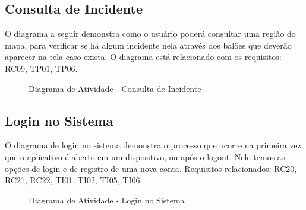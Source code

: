 \documentclass[12pt]{article}
\begin{document}
\subsection{Consulta de Incidente}

O diagrama a seguir demonstra como o usuário poderá consultar uma região do mapa, para verificar se há algum incidente nela através dos balões que deverão aparecer na tela caso exista. O diagrama está relacionado com os requisitos: RC09, TP01, TP06.

  \begin{figure}[!htb]
    \caption{\label{fig:diagConsultaInci} Diagrama de Atividade - Consulta de Incidente}
  \end{figure}

\vfill%
\pagebreak%

\subsection{Login no Sistema}

O diagrama de login no sistema demonstra o processo que ocorre na primeira vez que o aplicativo é aberto em um dispositivo, ou após o logout. Nele temos as opções de login e de registro de uma nova conta. Requisitos relacionados: RC20, RC21, RC22, TI01, TI02, TI05, TI06.

  \begin{figure}[!htb]
    \caption{\label{fig:diagAtiviLogin} Diagrama de Atividade - Login no Sistema}
  \end{figure}
\end{document}
